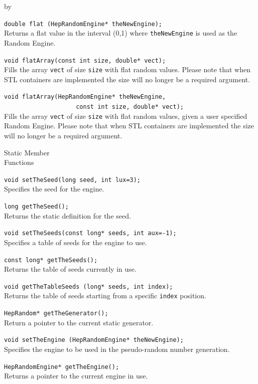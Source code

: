 \documentclass[twoside]{article}
\newcommand{\comp}[1]{\texttt{#1}}%
\newcommand{\entrylabel}[1]{\mbox{\textbf{{#1}}}\hfil}%
\newenvironment{entry}
{\begin{list}{}%
    {\renewcommand{\makelabel}{\entrylabel}%
     \setlength{\labelwidth}{90pt}%
     \setlength{\leftmargin}{\labelwidth}
     \advance\leftmargin by \labelsep%
      }%
    }%
  {\end{list}}
\newcommand{\Entrylabel}[1]%
{\raisebox{0pt}[1ex][0pt]{\makebox[\labelwidth][l]%
    {\parbox[t]{\labelwidth}{\hspace{0pt}\textbf{{#1}}}}}}
\newenvironment{Entry}%
{\renewcommand{\entrylabel}{\Entrylabel}\begin{entry}}%
  {\end{entry}}
\begin{document}
\begin{description}
\begin{Entry}
    \verb+double flat (HepRandomEngine* theNewEngine);+\\
    Returns a flat value in the interval (0,1)
    where \comp{theNewEngine} is used as the Random Engine.

    \verb+void flatArray(const int size, double* vect);+\\
    Fills the array \comp{vect} of size \comp{size}
    with flat random values.  Please note that when STL containers are
    implemented the size will no longer be a required argument.

    \verb+void flatArray(HepRandomEngine* theNewEngine,+\\ 
    \verb+                    const int size, double* vect);+\\
    Fills the array \comp{vect} of size \comp{size} with flat
    random values, given a user specified Random Engine.
    Please note that when STL containers are implemented the size
    will no longer be a required argument.

\item[Static Member\\ Functions]

    \verb+void setTheSeed(long seed, int lux=3);+\\
    Specifies the seed for the engine.

    \verb+long getTheSeed();+\\
    Returns the static definition for the seed.

    \verb+void setTheSeeds(const long* seeds, int aux=-1);+\\
    Specifies a table of seeds for the engine to use.

    \verb+const long* getTheSeeds();+\\
    Returns the table of seeds currently in use.

    \verb+void getTheTableSeeds (long* seeds, int index);+\\
    Returns the table of seeds starting from a specific \comp{index}
    position.

    \verb+HepRandom* getTheGenerator();+\\
    Return a pointer to the current static generator.

    \verb+void setTheEngine (HepRandomEngine* theNewEngine);+\\
    Specifies the engine to be used in the pseudo-random number generation.

    \verb+HepRandomEngine* getTheEngine();+\\
    Returns a pointer to the current engine in use.


\end{Entry}
\end{description}
\end{document}
